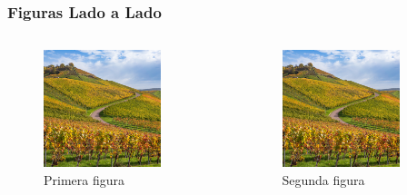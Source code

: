 \documentclass{pt-slides}
\begin{document}
\begin{frame}
    \frametitle{Figuras Lado a Lado}

    \begin{columns}
        \begin{column}{0.48\textwidth}
            \begin{figure}
                \centering
                \includegraphics[width=0.8\textwidth]{figures/background-default}
                \caption{Primera figura}
            \end{figure}
        \end{column}
        \begin{column}{0.48\textwidth}
            \begin{figure}
                \centering
                \includegraphics[width=0.8\textwidth]{figures/background-default}
                \caption{Segunda figura}
            \end{figure}
        \end{column}
    \end{columns}
\end{frame}
\end{document}
